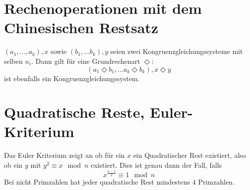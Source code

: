 \section{Rechenoperationen mit dem Chinesischen Restsatz}
$(a_1, \ldots, a_k), x$ sowie $(b_1, \ldots b_k), y$ seien zwei Kongruenzgleichungssysteme
mit selben $n_i$.
Dann gilt für eine Grundrechenart $\Diamond$:
\begin{equation}
    (a_1 \Diamond b_1, \ldots a_k \Diamond b_k), x \Diamond y
\end{equation}
ist ebenfalls ein Kongruenzgleichungssystem.

\section{Quadratische Reste, Euler-Kriterium}
Das Euler Kriterium zeigt an ob für ein $x$ ein Quadratischer Rest existiert, also ob ein
$y$ mit $y^2 \equiv x \mod n$ existiert. 
Dies ist genau dann der Fall, falls
\begin{equation}
    x^{\frac{n-1}{2}} \equiv 1 \mod n
\end{equation}
Bei nicht Primzahlen hat jeder quadratische Rest mindestens $4$ Primzahlen.

